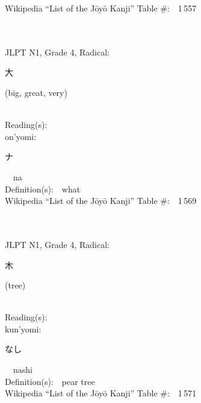 \begin{multicols}{2}
Wikipedia ``List of the J\=oy\=o Kanji'' Table \#:\ \ 1\,557 \\
\ \ \\
{\fontsize{34pt}{40pt}  }\ \ \\  %
{JLPT N1, Grade 4, Radical:\ \ {\begin{CJK}{UTF8}{min} 大 \end{CJK}} (big, great, very) } \\
Reading(s):\ \ \\
{\hspace*{1em}}on'yomi:\ \ \\
{\hspace*{2em}}{\begin{CJK}{UTF8}{min} ナ \end{CJK}}\ \ na\ \ \\
Definition(s):\ \ what \\
Wikipedia ``List of the J\=oy\=o Kanji'' Table \#:\ \ 1\,569 \\
\ \ \\
{\fontsize{34pt}{40pt}  }\ \ \\  %
{JLPT N1, Grade 4, Radical:\ \ {\begin{CJK}{UTF8}{min} 木 \end{CJK}} (tree) } \\
Reading(s):\ \ \\
{\hspace*{1em}}kun'yomi:\ \ \\
{\hspace*{2em}}{\begin{CJK}{UTF8}{min} なし \end{CJK}}\ \ nashi\ \ \\
Definition(s):\ \ pear tree \\
Wikipedia ``List of the J\=oy\=o Kanji'' Table \#:\ \ 1\,571 \\
\ \ \\
{\fontsize{34pt}{40pt}  }\ \ \\  %

\end{multicols}
